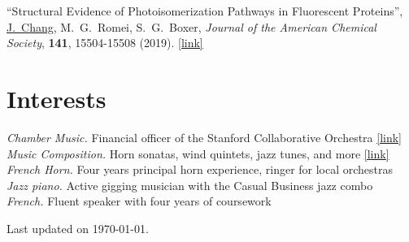 \documentclass[margin]{res}
\begin{document}
\begin{resume}
% 

\begin{changemargin}{0em}{3em}
    ``Structural Evidence of Photoisomerization Pathways in Fluorescent Proteins'',
    \underline{J.\ Chang}, M.\ G.\ Romei, S.\ G.\ Boxer,
    \textit{Journal of the American Chemical Society},
    \textbf{141},
    15504-15508
    (2019).
    \href{http://dx.doi.org/10.1021/jacs.9b08356}{[link]}
\end{changemargin}

\section{Interests}

\textit{Chamber Music.} Financial officer of the Stanford Collaborative Orchestra \href{https://scor.stanford.edu}{[link]} \\
\textit{Music Composition.} Horn sonatas, wind quintets, jazz tunes, and more \href{https://stanford.edu/~jeffjar/music.html}{[link]} \\
\textit{French Horn.} Four years principal horn experience, ringer for local orchestras \\
\textit{Jazz piano.} Active gigging musician with the Casual Business jazz combo \\
\textit{French.} Fluent speaker with four years of coursework

\end{resume}

\vfill\hfill{\scriptsize Last updated on \today.}
\end{document}
